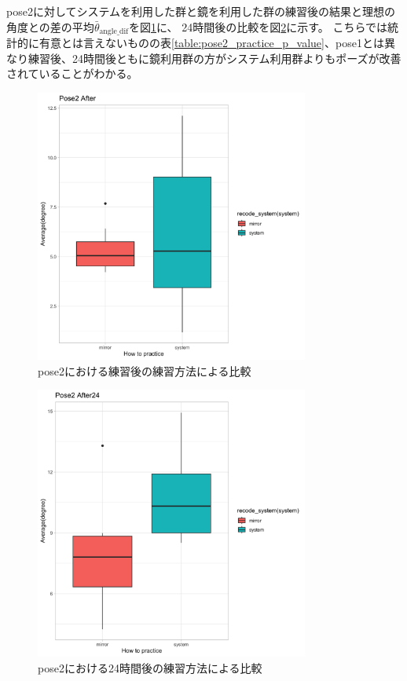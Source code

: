       pose2に対してシステムを利用した群と鏡を利用した群の練習後の結果と理想の角度との差の平均\(\bar{\theta}_{\text{angle\_dif}}\)を図\ref{fig:pose2_after_practice}に、
      24時間後の比較を図\ref{fig:pose2_after24_practice}に示す。
      こちらでは統計的に有意とは言えないものの表\ref{table:pose2_practice_p_value}、pose1とは異なり練習後、24時間後ともに鏡利用群の方がシステム利用群よりもポーズが改善されていることがわかる。
      \begin{figure}[H]
        \begin{center}
        \includegraphics[width=9cm]{figures/pose2_after_boxplot.png}
        \caption{pose2における練習後の練習方法による比較}
        \label{fig:pose2_after_practice}
        \end{center}
      \end{figure}

      \begin{figure}[H]
        \begin{center}
        \includegraphics[width=9cm]{figures/pose2_after24_boxplot.png}
        \caption{pose2における24時間後の練習方法による比較}
        \label{fig:pose2_after24_practice}
        \end{center}
      \end{figure}

